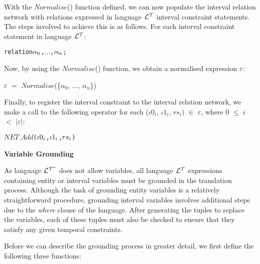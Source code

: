 \documentclass[11pt]{report}
\newenvironment{vverbatim}
{
  \begin{alltt}
}
{
  \vspace{-\baselineskip}
  \end{alltt}
}
\newenvironment{vquote}
{
  \begin{list}{}{\leftmargin 1em}\item[]
}
{
  \end{list}
}
\begin{document}
\begin{itemize}
              With the $Normalise$() function defined, we can now populate the
              interval relation network with relations expressed in language
              ${\cal L^T}$ interval constraint statements. The steps involved
              to achieve this is as follows. For each interval constraint
              statement in language ${\cal L^T}$:

              \begin{vverbatim}
  relation \(\alpha\sb{0}\), \(\ldots\), \(\alpha\sb{n}\);
              \end{vverbatim}

              Now, by using the $Normalise$() function, we obtain a normalised
              expression $\varepsilon$:

              \begin{vquote}
                $\varepsilon$ $=$
                  $Normalise$(\{${\alpha}_0$, $\ldots$, ${\alpha}_n$\})
              \end{vquote}

              Finally, to register the interval constraint to the interval
              relation network, we make a call to the following operator
              for each (${\iota}0_i$, ${\iota}1_i$, $rs_i$) $\in$
              $\varepsilon$, where $0$ $\leq$ $i$ $<$ $|\varepsilon|$:

              \begin{vverbatim}
  \(NET.Add\)(\({\iota}0\sb{i}\), \({\iota}1\sb{i}\), \(rs\sb{i}\))
              \end{vverbatim}

            \item
              {\bf Variable Grounding}

              As language ${\cal L^{T^*}}$ does not allow variables, all
	      language ${\cal L^T}$ expressions containing entity or interval
              variables must be grounded in the translation process. Although
              the task of grounding entity variables is a relatively
              straightforward procedure, grounding interval variables involves
              additional steps due to the {\em where} clause of the language.
              After generating the tuples to replace the variables, each of
              these tuples must also be checked to ensure that they satisfy
              any given temporal constraints.

              Before we can describe the grounding process in greater detail,
              we first define the following three functions:


\end{itemize}
\end{document}
